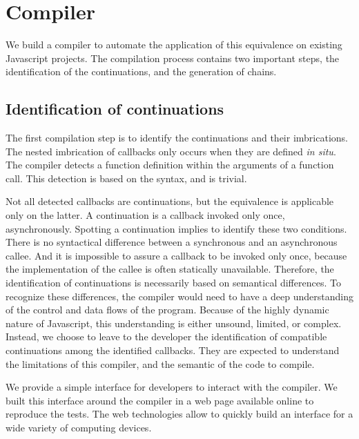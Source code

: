 \section{Compiler} \label{section:compiler}

We build a compiler to automate the application of this equivalence on existing Javascript projects.
The compilation process contains two important steps, the identification of the continuations, and the generation of chains.

\subsection{Identification of continuations}

The first compilation step is to identify the continuations and their imbrications.
The nested imbrication of callbacks only occurs when they are defined \textit{in situ}.
The compiler detects a function definition within the arguments of a function call.
This detection is based on the syntax, and is trivial.


Not all detected callbacks are continuations, but the equivalence is applicable only on the latter.
A continuation is a callback invoked only once, asynchronously.
Spotting a continuation implies to identify these two conditions.
There is no syntactical difference between a synchronous and an asynchronous callee.
And it is impossible to assure a callback to be invoked only once, because the implementation of the callee is often statically unavailable.
Therefore, the identification of continuations is necessarily based on semantical differences.
To recognize these differences, the compiler would need to have a deep understanding of the control and data flows of the program.
Because of the highly dynamic nature of Javascript, this understanding is either unsound, limited, or complex.
Instead, we choose to leave to the developer the identification of compatible continuations among the identified callbacks.
They are expected to understand the limitations of this compiler, and the semantic of the code to compile.

We provide a simple interface for developers to interact with the compiler.
We built this interface around the compiler in a web page available online to reproduce the tests.
The web technologies allow to quickly build an interface for a wide variety of computing devices.

